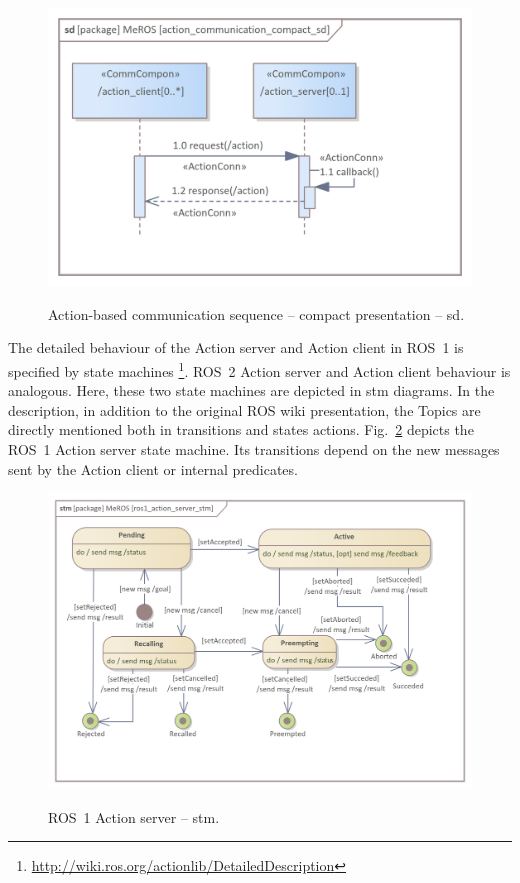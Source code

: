 \documentclass[11pt,oneside,a4paper]{article}
\begin{document}
	\begin{figure}[H]
		\centering
		\begin{center}
			{\includegraphics[scale=1.0]{img/meros_pkg/action_communication_compact_sd.png}}
		\end{center}
		\caption{Action-based communication sequence -- compact presentation -- sd.} 
		\label{fig:action_communication_compact_sd}
	\end{figure}


\pagebreak

	The detailed behaviour of the Action server and Action client in ROS~1 is specified by state machines \footnote{\url{http://wiki.ros.org/actionlib/DetailedDescription}}. ROS~2 Action server and Action client behaviour is analogous. Here, these two state machines are depicted in stm diagrams. In the description, in addition to the original ROS wiki presentation, the Topics are directly mentioned both in transitions and states actions.
	 Fig.~\ref{fig:ros1_action_server_stm} depicts the ROS~1 Action server state machine.
	  Its transitions depend on the new messages sent by the Action client or internal predicates. 
	  
	\begin{figure}[H]
		\centering
		\begin{center}
			{\includegraphics[scale=1.0]{img/meros_pkg/ros1_action_server_stm.png}}
		\end{center}
		\caption{ROS~1 Action server -- stm.} 
		\label{fig:ros1_action_server_stm}
	\end{figure}
	
\end{document}
